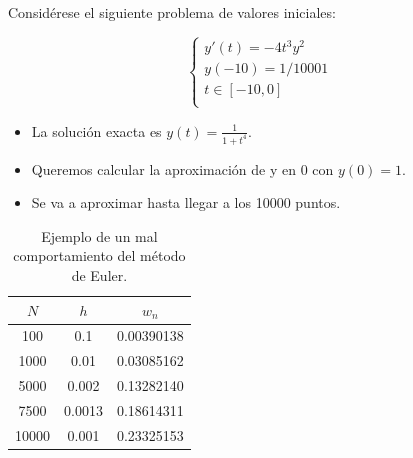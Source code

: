 {
	
	\begin{frame}
		Considérese el siguiente problema de valores iniciales:
		
		\begin{equation*}
			\begin{cases}
			y'(t) = -4 t^3 y^2 \\
			y(-10) = 1/10001 \\
			t \in [-10,0] \\
			\end{cases}
		\end{equation*}
		
		\begin{itemize}
			\item La solución exacta es $y(t)= \frac{1}{1+t^4}$.
			\item Queremos calcular la aproximación de y en 0 con $y(0)=1$.
			\item Se va a aproximar hasta llegar a los 10000 puntos.
		\end{itemize}				
	\end{frame}
}

{
	
	\begin{frame}
				\begin{table}[H]
					\centering
					\begin{tabular}{|| c | c | c ||}
						\hline
						\hline $N$ &  $h$ & $w_n$ \\
						\hline 100 & 0.1 & 0.00390138 \\
						\hline 1000 & 0.01 & 0.03085162 \\
						\hline 5000 & 0.002 & 0.13282140 \\
						\hline 7500 & 0.0013 & 0.18614311 \\
						\hline 10000 & 0.001 & 0.23325153 \\		
						\hline
						\hline	
					\end{tabular}
					\caption{Ejemplo de un mal comportamiento del método de Euler.}
					\label{table:euler}
				\end{table}
	\end{frame}
}


